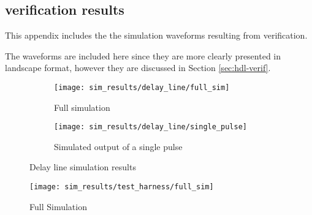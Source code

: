\begin{appendices}
	
	


\chapter{ verification results} \label{app:sim-wfms}
This appendix includes the the simulation waveforms resulting from verification.

The waveforms are included here since they are more clearly presented in landscape format, however they are discussed in Section \ref{sec:hdl-verif}.


\begin{landscape}

\begin{figure}[ht]
	\centering
	
	\begin{subfigure}[b]{\linewidth}
		\centering
		\texttt{[image: sim\_results/delay\_line/full\_sim]}
		\caption{Full simulation}
		\label{fig:delay-sim-full}
	\end{subfigure}
	
	\begin{subfigure}[b]{\linewidth}
		\centering
		\texttt{[image: sim\_results/delay\_line/single\_pulse]}
		\caption{Simulated output of a single pulse}
		\label{fig:delay-sim-single}
	\end{subfigure}
	
	\caption{Delay line simulation results}
	\label{fig:delay-sim}
\end{figure}

\begin{figure}[ht]
	\centering
	\texttt{[image: sim\_results/test\_harness/full\_sim]}
	\caption{Full Simulation}
	\label{fig:harness-full}
\end{figure}

\end{landscape}

\end{appendices}